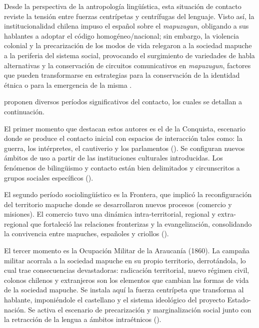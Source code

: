 \documentclass[output=paper]{../langscibook}
\begin{document}
\largerpage
Desde la perspectiva de la antropología lingüística, esta situación de contacto reviste la tensión entre fuerzas centrípetas y centrífugas del lenguaje. Visto así, la institucionalidad chilena impuso el español sobre el \textit{mapuzugun}, obligando a sus hablantes a adoptar el código homogéneo/nacional; sin embargo, la violencia colonial y la precarización de los modos de vida relegaron a la sociedad mapuche a la periferia del sistema social, provocando el surgimiento de variedades de habla alternativas y la conservación de circuitos comunicativos en \textit{mapuzugun}, factores que pueden transformarse en estrategias para la conservación de la identidad étnica o para la emergencia de la misma \citep{Duranti2000}.   

\citet{OlateVinetWittigGonzález2019} proponen diversos períodos significativos del contacto, los cuales se detallan a continuación.

El primer momento que destacan estos autores es el de la Conquista, escenario donde se produce el contacto inicial con espacios de interacción tales como: la guerra, los intérpretes, el cautiverio y los parlamentos (\citealt{DuránRamos1986}). Se configuran nuevos ámbitos de uso a partir de las instituciones culturales introducidas. Los fenómenos de bilingüismo y contacto están bien delimitados y circunscritos a grupos sociales específicos (\citealt{OlateVinetWittigGonzález2019}).

El segundo período sociolingüístico es la Frontera, que implicó la reconfiguración del territorio mapuche donde se desarrollaron nuevos procesos (comercio y misiones). El comercio tuvo una dinámica intra-territorial, regional y extra-regional que fortaleció las relaciones fronterizas y la evangelización, consolidando la convivencia entre mapuches, españoles y criollos (\citealt{PintoRodríguez2000}).

El tercer momento es la Ocupación Militar de la Araucanía (1860). La campaña militar acorrala a la sociedad mapuche en su propio territorio, derrotándola, lo cual trae consecuencias devastadoras: radicación territorial, nuevo régimen civil, colonos chilenos y extranjeros son los elementos que cambian las formas de vida de la sociedad mapuche. Se instala aquí la fuerza centrípeta que transforma al hablante, imponiéndole el castellano y el sistema ideológico del proyecto Estado-nación. Se activa el escenario de precarización y marginalización social junto con la retracción de la lengua a ámbitos intraétnicos (\citealt{OlateVinetWittigGonzález2019}).
\end{document}
